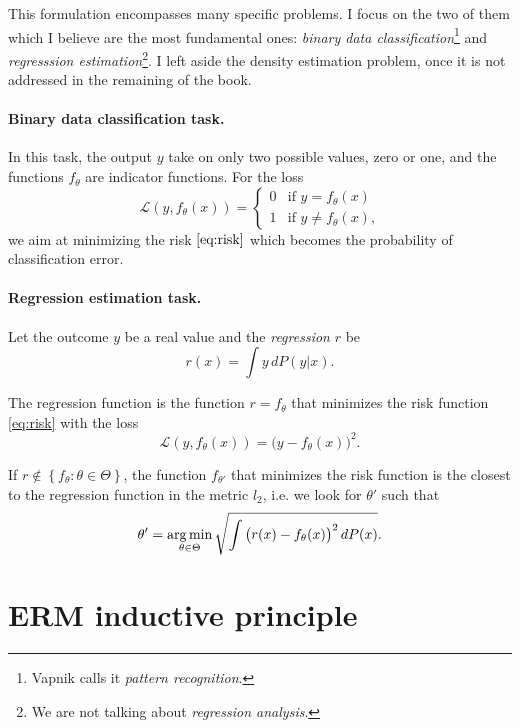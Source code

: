 This formulation encompasses many specific problems. I focus on the two of them which I
believe are the most fundamental ones: \emph{binary data classification}\footnote{Vapnik
calls it \emph{pattern recognition}.} and \emph{regresssion estimation}\footnote{We are not talking about
\emph{regression analysis}.}.  I left aside the density estimation problem, once it is not
addressed in the remaining of the book.

\paragraph{Binary data classification task.}  In this task, the output $y$ take on
only two possible values, zero or one, and the functions $f_\theta$ are indicator
functions. For the loss
\begin{equation*}
  \mathcal{L}(y, f_\theta(x)) = \begin{cases}
    0 & \text{if } y = f_\theta(x) \\
    1 & \text{if } y \neq f_\theta(x)\text{,}
  \end{cases}
\end{equation*}
we aim at minimizing the risk $\eqref{eq:risk}$ which becomes the probability of
classification error.

\paragraph{Regression estimation task.} Let the outcome $y$ be a real value and
the \emph{regression} $r$ be $$r(x) = \int y\, dP(y|x) \text{.}$$

The regression function is the function $r = f_\theta$ that minimizes the risk function
\eqref{eq:risk} with the loss
\begin{equation*}
  \mathcal{L}(y, f_\theta(x)) = \big(y - f_\theta(x)\big)^2\text{.}
\end{equation*}

If $r \not\in \left\{ f_\theta : \theta\in\Theta \right\}$, the function $f_{\theta'}$
that minimizes the risk function is the closest to the regression function in the
metric $l_2$, i.e. we look for $\theta'$ such that
\begin{equation*}
  \theta' = \operatorname*{arg\,min}_{\theta \in \Theta} \sqrt{
    \int \big(r(x) - f_\theta(x)\big)^2\, dP(x)
  }\text{.}
\end{equation*}

\section{ERM inductive principle}

